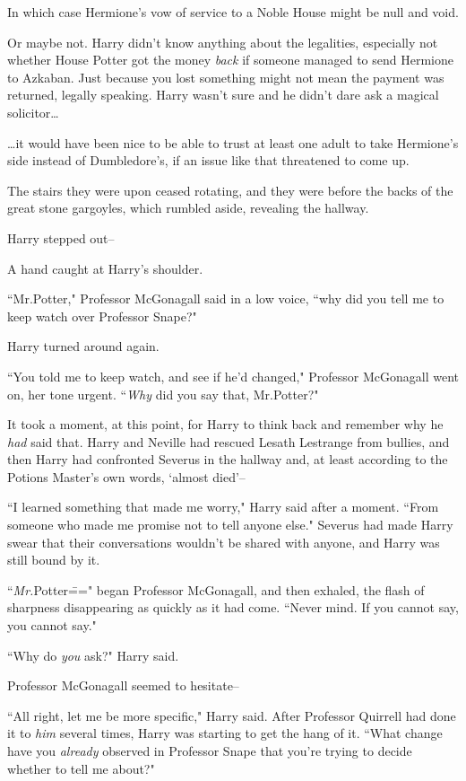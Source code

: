 In which case Hermione's vow of service to a Noble House might be null and void.

Or maybe not. Harry didn't know anything about the legalities, especially not whether House Potter got the money \emph{back} if someone managed to send Hermione to Azkaban. Just because you lost something might not mean the payment was returned, legally speaking. Harry wasn't sure and he didn't dare ask a magical solicitor{\ldots}

{\ldots}it would have been nice to be able to trust at least one adult to take Hermione's side instead of Dumbledore's, if an issue like that threatened to come up.

The stairs they were upon ceased rotating, and they were before the backs of the great stone gargoyles, which rumbled aside, revealing the hallway.

Harry stepped out\---

A hand caught at Harry's shoulder.

``Mr.\?Potter," Professor McGonagall said in a low voice, ``why did you tell me to keep watch over Professor Snape?"

Harry turned around again.

``You told me to keep watch, and see if he'd changed," Professor McGonagall went on, her tone urgent. ``\emph{Why} did you say that, Mr.\?Potter?"

It took a moment, at this point, for Harry to think back and remember why he \emph{had} said that. Harry and Neville had rescued Lesath Lestrange from bullies, and then Harry had confronted Severus in the hallway and, at least according to the Potions Master's own words, `almost died'\---

``I learned something that made me worry," Harry said after a moment. ``From someone who made me promise not to tell anyone else." Severus had made Harry swear that their conversations wouldn't be shared with anyone, and Harry was still bound by it.

``\emph{Mr.}\?Potter\===" began Professor McGonagall, and then exhaled, the flash of sharpness disappearing as quickly as it had come. ``Never mind. If you cannot say, you cannot say."

``Why do \emph{you} ask?" Harry said.

Professor McGonagall seemed to hesitate\---

``All right, let me be more specific," Harry said. After Professor Quirrell had done it to \emph{him} several times, Harry was starting to get the hang of it. ``What change have you \emph{already} observed in Professor Snape that you're trying to decide whether to tell me about?"

